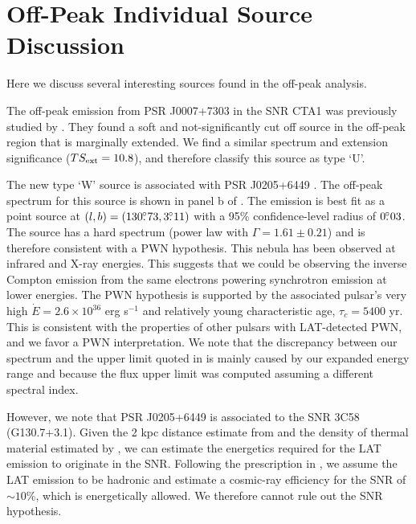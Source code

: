 \section{Off-Peak Individual Source Discussion}

Here we discuss several interesting sources found in the off-peak analysis.

The off-peak emission from PSR J0007+7303 in the SNR CTA1 was previously
studied by \cite{abdo_2012a_j00077303-supernova}.  They found a soft and
not-significantly cut off source in the off-peak region that is marginally
extended.  We find a similar spectrum and extension significance ($TS_{\rm
ext}=10.8$), and therefore classify this source as type `U'.

The new type `W' source is associated with PSR J0205+6449
\citep{abdo_2009a_discovery-pulsations}.  The off-peak spectrum for this
source is shown in panel b of .  The emission
is best fit as a point source at $(l,b)=(130\mbox{$.\!\!^\circ$}73,3\mbox{$.\!\!^\circ$}11)$ with a
95\% confidence-level radius of $0\mbox{$.\!\!^\circ$}03$.  The source has a hard
spectrum (power law with $\Gamma=1.61\pm0.21$) and is therefore
consistent with a PWN hypothesis.  This nebula has been observed
at infrared \citep{slane_2008a_infrared-detection} and X-ray
\citep{slane_2004a_constraints-structure} energies. This suggests
that we could be observing the inverse Compton emission from the same
electrons powering synchrotron emission at lower energies.  The PWN
hypothesis is supported by the associated pulsar's very high $\dot
E=2.6\times10^{36}$ erg s$^{-1}$ and relatively young characteristic
age, $\tau_c = 5400$ yr. This is consistent with the properties of
other pulsars with LAT-detected PWN, and we favor a PWN interpretation.
We note that the discrepancy between our spectrum and the upper limit
quoted in \citet{ackermann_2011a_fermi-lat-search} is mainly caused by
our expanded energy range and because the flux upper limit was computed
assuming a different spectral index.

However, we note that PSR J0205+6449 is associated to the
SNR 3C58 (G130.7+3.1).  Given the 2 kpc distance estimate from
\cite{abdo_2013a_second-fermi} and the density of thermal material estimated by
\cite{slane_2004a_constraints-structure}, we can estimate the energetics
required for the LAT emission to originate in the SNR.  Following the
prescription in \cite{drury_1994a_gamma-ray-visibility}, we assume the
LAT emission to be hadronic and estimate a cosmic-ray efficiency for the
SNR of $\sim10$\%, which is energetically allowed.  We therefore cannot
rule out the SNR hypothesis.

